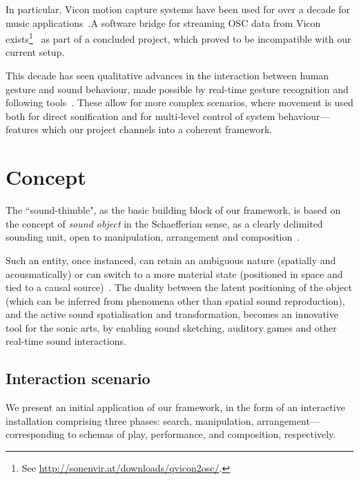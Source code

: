 In particular, Vicon motion capture systems have been used for over a decade for music applications~\cite{dobrian2003gestural,kapur2005framework,eckel2009motion,vigliensoni2012quantitative}.\linebreak A software bridge for streaming OSC data from Vicon \linebreak exists\footnote{See \url{http://sonenvir.at/downloads/qvicon2osc/}.}~\cite{eckel2009motion} as part of a concluded project, which proved to be incompatible with our current setup.

This decade has seen qualitative advances in the interaction between human gesture and sound behaviour, made possible by real-time gesture recognition and following tools~\cite{caramiaux2014mapping,caramiaux2015adaptive,probabilisticmodels}. These allow for more complex scenarios, where movement is used both for direct sonification and for multi-level control of system behaviour---features which our project channels into a coherent framework.

\section{Concept}
\label{sec:proj}


The ``sound-thimble", as the basic building block of our framework, is based on the concept of \textit{sound object} in the Schaefferian sense, as a clearly delimited sounding unit, open to manipulation, arrangement and composition~\cite{schaeffer1998solfege}.

Such an entity, once instanced, can retain an ambiguous nature (spatially and acousmatically) or can switch to a more material state (positioned in space and tied to a causal source)~\cite{soundunseen}. The duality between the latent positioning of the object (which can be inferred from phenomena other than spatial sound reproduction), and the active sound spatialisation and transformation, becomes an innovative tool for the sonic arts, by enabling sound sketching, auditory games and other real-time sound interactions. 

\subsection{Interaction scenario}
\label{sec:scenario}

We present an initial application of our framework, in the form of an interactive installation comprising three phases: search, manipulation, arrangement---corresponding to schemas of play, performance, and composition, respectively.


